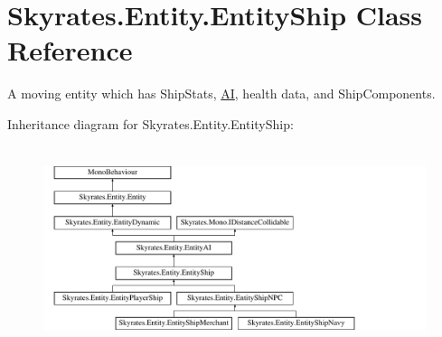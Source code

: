 \hypertarget{class_skyrates_1_1_entity_1_1_entity_ship}{\section{Skyrates.\-Entity.\-Entity\-Ship Class Reference}
\label{class_skyrates_1_1_entity_1_1_entity_ship}
}


A moving entity which has Ship\-Stats, \hyperlink{namespace_skyrates_1_1_a_i}{A\-I}, health data, and Ship\-Components.  


Inheritance diagram for Skyrates.\-Entity.\-Entity\-Ship\-:\begin{figure}[H]
\begin{center}
\leavevmode
\includegraphics[height=5.993884cm]{class_skyrates_1_1_entity_1_1_entity_ship}
\end{center}
\end{figure}
